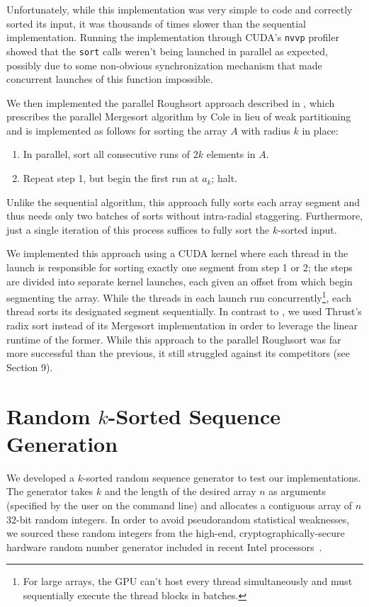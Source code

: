 \documentclass[letterpaper, 12pt]{article}
\let\supercite\cite
\renewcommand{\cite}[1]{\textnormal{~\supercite{#1}}}
\begin{document}
Unfortunately, while this implementation was very simple to code and correctly sorted its input, it was thousands of times
  slower than the sequential implementation.
Running the implementation through CUDA's \texttt{nvvp} profiler showed that the \texttt{sort} calls weren't being launched in
  parallel as expected, possibly due to some non-obvious synchronization mechanism that made concurrent launches of this
  function impossible.

We then implemented the parallel Roughsort approach described in \supercite{altman90}, which prescribes the parallel Mergesort
  algorithm by Cole in lieu of weak partitioning and is implemented as follows for sorting the array $A$ with radius $k$ in
  place:
\begin{enumerate}\setlength{\itemsep}{0pt}\setlength{\parskip}{0pt}
\item In parallel, sort all consecutive runs of $2k$ elements in $A$.
\item Repeat step 1, but begin the first run at $a_k$; halt.
\end{enumerate}

Unlike the sequential algorithm, this approach fully sorts each array segment and thus needs only two batches of
  sorts without intra-radial staggering.
Furthermore, just a single iteration of this process suffices to fully sort the $k$-sorted input.

We implemented this approach using a CUDA kernel where each thread in the launch is responsible for sorting exactly one segment
  from step 1 or 2; the steps are divided into separate kernel launches, each given an offset from which begin segmenting the
  array.
While the threads in each launch run concurrently\footnote{For large arrays, the GPU can't host every thread simultaneously and
  must sequentially execute the thread blocks in batches.}, each thread sorts its designated segment sequentially.
In contrast to \supercite{altman90}, we used Thrust's radix sort instead of its Mergesort implementation in order to leverage
  the linear runtime of the former.
While this approach to the parallel Roughsort was far more successful than the previous, it still struggled against
  its competitors (see Section 9).

\section{Random $k$-Sorted Sequence Generation}
We developed a $k$-sorted random sequence generator to test our implementations.
The generator takes $k$ and the length of the desired array $n$ as arguments (specified by the user on the command line) and
  allocates a contiguous array of $n$ 32-bit random integers.
In order to avoid pseudorandom statistical weaknesses, we sourced these random integers from the high-end,
   cryptographically-secure hardware random number generator included in recent Intel processors\cite{intel12}.
\end{document}
